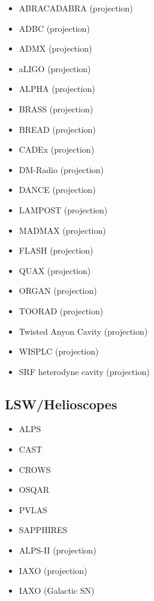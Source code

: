 \documentclass[9pt,twocolumn]{extarticle}
\begin{document}
\begin{mdframed}[everyline=true]
\begin{itemize}
    \item ABRACADABRA (projection)~\cite{ABRACADABRA}
	\item ADBC (projection)~\cite{Liu:2018icu} 
	\item ADMX (projection)~\cite{Stern:2016bbw}
              \item aLIGO (projection)~\cite{Nagano:2019rbw} 
           \item ALPHA (projection)~\cite{Lawson:2019brd,Millar:2022peq} 
           \item BRASS (projection)~\cite{BRASS}
           \item BREAD (projection)~\cite{Liu:2021pei}
           \item CADEx (projection)~\cite{Aja:2022csb}
    \item DM-Radio (projection)~\cite{DMRadio,DMRadio:2022pkf}
     \item DANCE (projection)~\cite{Michimura:2019qxr} 
           \item LAMPOST (projection)~\cite{Baryakhtar:2018doz} 
      \item MADMAX (projection)~\cite{Beurthey:2020yuq} 
           \item FLASH (projection)~\cite{Alesini:2017ifp,FLASH} 
           \item QUAX (projection)~\cite{QUAX} 
                 \item ORGAN (projection)~\cite{McAllister:2017lkb} 
                       \item TOORAD (projection)~\cite{Schutte-Engel:2021bqm} 
                       \item Twisted Anyon Cavity (projection)~\cite{Bourhill:2022alm}
                       \item WISPLC (projection)~\cite{Zhang:2021bpa} 
                       \item SRF heterodyne cavity (projection)~\cite{Berlin:2020vrk}

\end{itemize}
\vspace{-2.5em}
\subsection*{LSW/Helioscopes}\vspace{-0.5em}
\begin{itemize}\setlength\itemsep{-0.5em}
    \item ALPS~\cite{Ehret:2010mh}
    \item CAST~\cite{CAST:2007jps,CAST:2017uph}
    \item CROWS~\cite{Betz:2013dza}
    \item OSQAR~\cite{OSQAR:2015qdv}
    \item PVLAS~\cite{DellaValle:2015xxa}
    \item SAPPHIRES~\cite{SAPPHIRES:2021vkz,SAPPHIRES:2022bqg}
    \item ALPS-II (projection)~\cite{Ortiz:2020tgs}
    \item IAXO (projection)~\cite{IAXO:2019mpb}
    \item IAXO (Galactic SN)~\cite{Ge:2020zww}
\end{itemize}



\end{mdframed}
\end{document}
